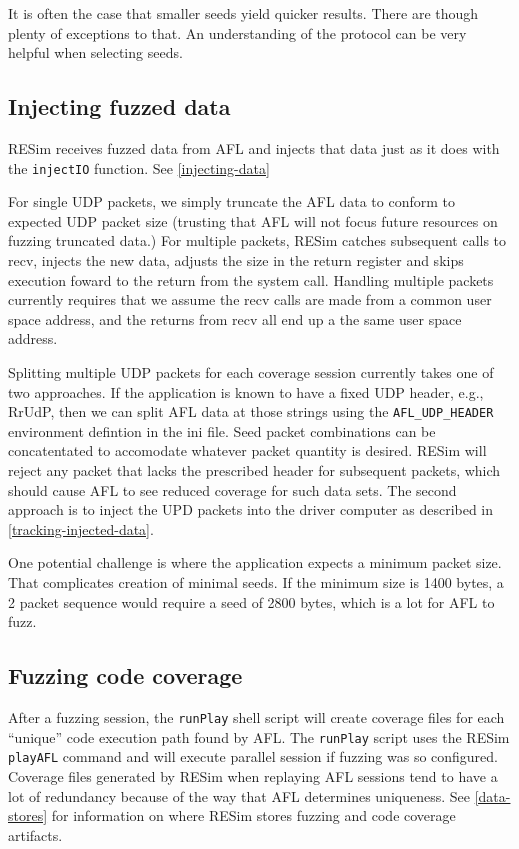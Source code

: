 \documentclass[titlepage]{article}
\begin{document}
It is often the case that smaller seeds yield quicker results.  There are though plenty of exceptions to that.  An understanding of the protocol can
be very helpful when selecting seeds.

\subsection{Injecting fuzzed data}
RESim receives fuzzed data from AFL and injects that data just as it does with the {\tt injectIO} function.
See \ref{injecting-data}

For single UDP packets, we simply truncate the AFL data to conform to expected UDP packet size (trusting that AFL will not focus future resources on fuzzing 
truncated data.)    For multiple packets, RESim catches subsequent calls to recv, injects the new data, adjusts the size in the
return register and skips execution foward to the return from the system call.
Handling multiple packets currently requires that we assume the recv calls are made from a common user space address, and
the returns from recv all end up a the same user space address.  

Splitting multiple UDP packets for each coverage session currently takes one of two approaches.  If the application is known
to have a fixed UDP header, e.g., RrUdP, then we can split AFL data at those strings using the {\tt AFL\_UDP\_HEADER} environment
defintion in the ini file.  Seed packet combinations can be concatentated
to accomodate whatever packet quantity is desired.  RESim will reject any packet that lacks the prescribed header for subsequent
packets, which should cause AFL to see reduced coverage for such data sets.  The second approach is to inject the UPD packets
into the driver computer as described in  \ref{tracking-injected-data}.

One potential challenge is where the application expects a minimum packet size.  That complicates creation of minimal seeds.  If the
minimum size is 1400 bytes, a 2 packet sequence would require a seed of 2800 bytes, which is a lot for AFL to fuzz.

\subsection{Fuzzing code coverage}
\label{fuzzing-coverage}
After a fuzzing session, the {\tt runPlay} shell script will create coverage files for each ``unique'' code execution path found by AFL.  The {\tt runPlay} script uses
the RESim {\tt playAFL} command and will execute parallel session if fuzzing was so configured.  Coverage files generated by RESim when replaying
AFL sessions  tend to have a lot of redundancy because of the way that AFL determines uniqueness.  See \ref{data-stores} for information on where RESim stores fuzzing
and code coverage artifacts.
\end{document}
